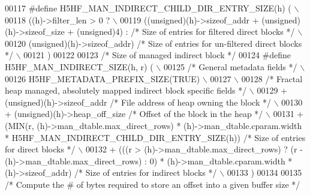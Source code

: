 \begin{DoxyCode}
00117 \textcolor{preprocessor}{#define H5HF\_MAN\_INDIRECT\_CHILD\_DIR\_ENTRY\_SIZE(h) (                           \(\backslash\)}
00118 \textcolor{preprocessor}{    ((h)->filter\_len > 0 ?                                                    \(\backslash\)}
00119 \textcolor{preprocessor}{        ((unsigned)(h)->sizeof\_addr + (unsigned)(h)->sizeof\_size + (unsigned)4) : }\textcolor{comment}{/* Size of entries for
       filtered direct blocks */}\textcolor{preprocessor}{ \(\backslash\)}
00120 \textcolor{preprocessor}{        (unsigned)(h)->sizeof\_addr)             }\textcolor{comment}{/* Size of entries for un-filtered direct blocks */}\textcolor{preprocessor}{ \(\backslash\)}
00121 \textcolor{preprocessor}{    )}
00122 
00123 \textcolor{comment}{/* Size of managed indirect block */}
00124 \textcolor{preprocessor}{#define H5HF\_MAN\_INDIRECT\_SIZE(h, r) (                                        \(\backslash\)}
00125 \textcolor{preprocessor}{    }\textcolor{comment}{/* General metadata fields */}\textcolor{preprocessor}{                                             \(\backslash\)}
00126 \textcolor{preprocessor}{    H5HF\_METADATA\_PREFIX\_SIZE(TRUE)                                           \(\backslash\)}
00127 \textcolor{preprocessor}{                                                                              \(\backslash\)}
00128 \textcolor{preprocessor}{    }\textcolor{comment}{/* Fractal heap managed, absolutely mapped indirect block specific fields */}\textcolor{preprocessor}{ \(\backslash\)}
00129 \textcolor{preprocessor}{    + (unsigned)(h)->sizeof\_addr          }\textcolor{comment}{/* File address of heap owning the block */}\textcolor{preprocessor}{   \(\backslash\)}
00130 \textcolor{preprocessor}{    + (unsigned)(h)->heap\_off\_size        }\textcolor{comment}{/* Offset of the block in the heap */}\textcolor{preprocessor}{         \(\backslash\)}
00131 \textcolor{preprocessor}{    + (MIN(r, (h)->man\_dtable.max\_direct\_rows) * (h)->man\_dtable.cparam.width *
       H5HF\_MAN\_INDIRECT\_CHILD\_DIR\_ENTRY\_SIZE(h)) }\textcolor{comment}{/* Size of entries for direct blocks */}\textcolor{preprocessor}{ \(\backslash\)}
00132 \textcolor{preprocessor}{    + (((r > (h)->man\_dtable.max\_direct\_rows) ? (r - (h)->man\_dtable.max\_direct\_rows) : 0)  *
       (h)->man\_dtable.cparam.width * (h)->sizeof\_addr) }\textcolor{comment}{/* Size of entries for indirect blocks */}\textcolor{preprocessor}{ \(\backslash\)}
00133 \textcolor{preprocessor}{    )}
00134 
00135 \textcolor{comment}{/* Compute the # of bytes required to store an offset into a given buffer size */}

\end{DoxyCode}
